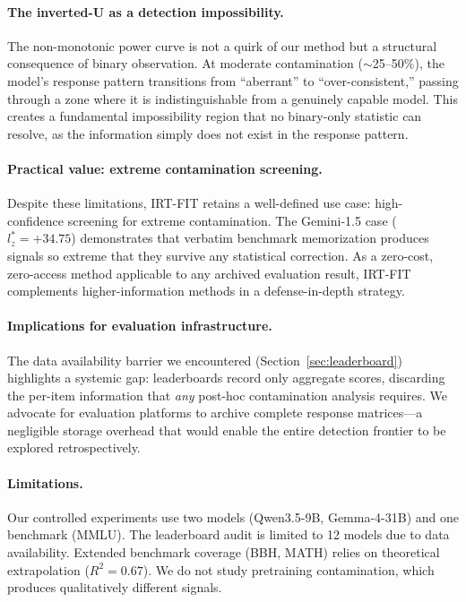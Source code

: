 \documentclass[11pt,a4paper]{article}
\begin{document}
\paragraph{The inverted-U as a detection impossibility.}
The non-monotonic power curve is not a quirk of our method but a structural consequence of binary observation. At moderate contamination ($\sim$25--50\%), the model's response pattern transitions from ``aberrant'' to ``over-consistent,'' passing through a zone where it is indistinguishable from a genuinely capable model. This creates a fundamental impossibility region that no binary-only statistic can resolve, as the information simply does not exist in the response pattern.

\paragraph{Practical value: extreme contamination screening.}
Despite these limitations, IRT-FIT retains a well-defined use case: high-confidence screening for extreme contamination. The Gemini-1.5 case ($l_z^* = +34.75$) demonstrates that verbatim benchmark memorization produces signals so extreme that they survive any statistical correction. As a zero-cost, zero-access method applicable to any archived evaluation result, IRT-FIT complements higher-information methods in a defense-in-depth strategy.

\paragraph{Implications for evaluation infrastructure.}
The data availability barrier we encountered (Section~\ref{sec:leaderboard}) highlights a systemic gap: leaderboards record only aggregate scores, discarding the per-item information that \emph{any} post-hoc contamination analysis requires. We advocate for evaluation platforms to archive complete response matrices---a negligible storage overhead that would enable the entire detection frontier to be explored retrospectively.

\paragraph{Limitations.}
Our controlled experiments use two models (Qwen3.5-9B, Gemma-4-31B) and one benchmark (MMLU). The leaderboard audit is limited to 12 models due to data availability. Extended benchmark coverage (BBH, MATH) relies on theoretical extrapolation ($R^2 = 0.67$). We do not study pretraining contamination, which produces qualitatively different signals.
\end{document}
